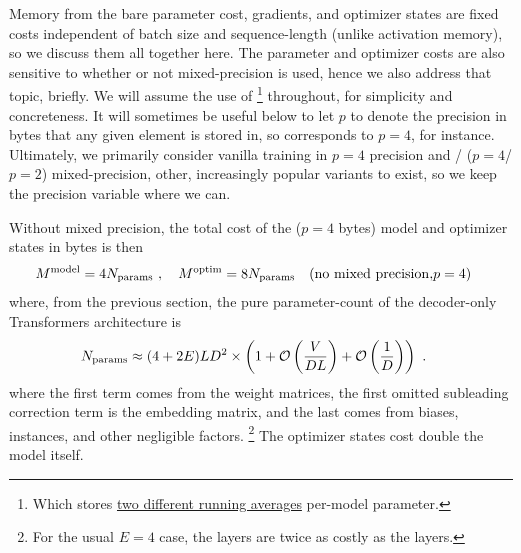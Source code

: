 \documentclass[11pt]{article}
\begin{document}
Memory from the bare parameter cost, gradients, and optimizer states are fixed costs independent of
batch size and sequence-length (unlike activation memory), so we discuss them all together here. The
parameter and optimizer costs are also sensitive to whether or not mixed-precision is used, hence we
also address that topic, briefly.  We will assume the use of \footnote{Which stores
    \href{https://pytorch.org/docs/stable/generated/torch.optim.Adam.html}{two different running
averages} per-model parameter.} throughout, for simplicity and concreteness. It will sometimes be
useful below to let $ p $ to denote the precision in bytes that any given element is stored in, so
 corresponds to $ p=4 $, for instance. Ultimately, we primarily consider
vanilla training in $ p=4 $ precision and / ($ p=4
$/ $ p=2 $)  mixed-precision, other, increasingly popular variants to exist, so we keep the
precision variable where we can.


Without mixed precision, the total cost of the
 ($ p=4 $ bytes) model and optimizer states in bytes is then
\begin{align}
    M ^{ \rm model} &= 4 N _{ \rm params } \ , \quad M^{ \rm  optim } = 8 N _{ \rm params }
    \quad ({\rm no \ mixed \ precision, } p=4)
    \label{eq_optimizer_states_mem_no_mp}
\end{align}
where, from the previous section, the pure parameter-count of the decoder-only Transformers
architecture is
\begin{align}
    N _{ \rm params } &\approx  (4 + 2E) L D ^{ 2 } \times \left ( 1 + \mathcal{O} \left( \frac{ V }{ DL }
    \right) + \mathcal{O} \left( \frac{ 1 }{ D } \right)  \right ) \ . \label{eq_approx_params_no_sharding}
\end{align}
where the first term comes from the  weight matrices, the first omitted
subleading correction term is the embedding matrix, and the last comes from biases,
 instances, and other negligible factors. \footnote{For the usual $ E=4 $ case,
    the  layers are twice as costly as the  layers.} The
    optimizer states cost double the model itself.
\end{document}
